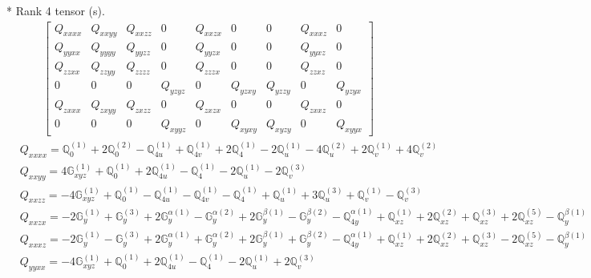 \documentclass[fleqn,8pt,landscape]{jsarticle}
\begin{document}
* Rank 4 tensor (s).
\begin{align*}
\begin{bmatrix} Q_{xxxx} & Q_{xxyy} & Q_{xxzz} & 0 & Q_{xxzx} & 0 & 0 & Q_{xxxz} & 0 \\ Q_{yyxx} & Q_{yyyy} & Q_{yyzz} & 0 & Q_{yyzx} & 0 & 0 & Q_{yyxz} & 0 \\ Q_{zzxx} & Q_{zzyy} & Q_{zzzz} & 0 & Q_{zzzx} & 0 & 0 & Q_{zzxz} & 0 \\ 0 & 0 & 0 & Q_{yzyz} & 0 & Q_{yzxy} & Q_{yzzy} & 0 & Q_{yzyx} \\ Q_{zxxx} & Q_{zxyy} & Q_{zxzz} & 0 & Q_{zxzx} & 0 & 0 & Q_{zxxz} & 0 \\ 0 & 0 & 0 & Q_{xyyz} & 0 & Q_{xyxy} & Q_{xyzy} & 0 & Q_{xyyx} \end{bmatrix}
\end{align*}
\begin{align*}
& Q_{xxxx} = \mathbb{Q}_{0}^{(1)} + 2 \mathbb{Q}_{0}^{(2)} - \mathbb{Q}_{4u}^{(1)} + \mathbb{Q}_{4v}^{(1)} + 2 \mathbb{Q}_{4}^{(1)} - 2 \mathbb{Q}_{u}^{(1)} - 4 \mathbb{Q}_{u}^{(2)} + 2 \mathbb{Q}_{v}^{(1)} + 4 \mathbb{Q}_{v}^{(2)} \\
& Q_{xxyy} = 4 \mathbb{G}_{xyz}^{(1)} + \mathbb{Q}_{0}^{(1)} + 2 \mathbb{Q}_{4u}^{(1)} - \mathbb{Q}_{4}^{(1)} - 2 \mathbb{Q}_{u}^{(1)} - 2 \mathbb{Q}_{v}^{(3)} \\
& Q_{xxzz} = - 4 \mathbb{G}_{xyz}^{(1)} + \mathbb{Q}_{0}^{(1)} - \mathbb{Q}_{4u}^{(1)} - \mathbb{Q}_{4v}^{(1)} - \mathbb{Q}_{4}^{(1)} + \mathbb{Q}_{u}^{(1)} + 3 \mathbb{Q}_{u}^{(3)} + \mathbb{Q}_{v}^{(1)} - \mathbb{Q}_{v}^{(3)} \\
& Q_{xxzx} = - 2 \mathbb{G}_{y}^{(1)} + \mathbb{G}_{y}^{(3)} + 2 \mathbb{G}_{y}^{\alpha(1)} - \mathbb{G}_{y}^{\alpha(2)} + 2 \mathbb{G}_{y}^{\beta(1)} - \mathbb{G}_{y}^{\beta(2)} - \mathbb{Q}_{4y}^{\alpha(1)} + \mathbb{Q}_{xz}^{(1)} + 2 \mathbb{Q}_{xz}^{(2)} + \mathbb{Q}_{xz}^{(3)} + 2 \mathbb{Q}_{xz}^{(5)} - \mathbb{Q}_{y}^{\beta(1)} \\
& Q_{xxxz} = - 2 \mathbb{G}_{y}^{(1)} - \mathbb{G}_{y}^{(3)} + 2 \mathbb{G}_{y}^{\alpha(1)} + \mathbb{G}_{y}^{\alpha(2)} + 2 \mathbb{G}_{y}^{\beta(1)} + \mathbb{G}_{y}^{\beta(2)} - \mathbb{Q}_{4y}^{\alpha(1)} + \mathbb{Q}_{xz}^{(1)} + 2 \mathbb{Q}_{xz}^{(2)} + \mathbb{Q}_{xz}^{(3)} - 2 \mathbb{Q}_{xz}^{(5)} - \mathbb{Q}_{y}^{\beta(1)} \\
& Q_{yyxx} = - 4 \mathbb{G}_{xyz}^{(1)} + \mathbb{Q}_{0}^{(1)} + 2 \mathbb{Q}_{4u}^{(1)} - \mathbb{Q}_{4}^{(1)} - 2 \mathbb{Q}_{u}^{(1)} + 2 \mathbb{Q}_{v}^{(3)} \\

\end{align*}
\end{document}
